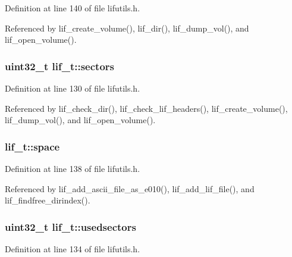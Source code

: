 Definition at line 140 of file lifutils.\+h.



Referenced by lif\+\_\+create\+\_\+volume(), lif\+\_\+dir(), lif\+\_\+dump\+\_\+vol(), and lif\+\_\+open\+\_\+volume().

\subsubsection[{\texorpdfstring{sectors}{sectors}}]{\setlength{\rightskip}{0pt plus 5cm}uint32\+\_\+t lif\+\_\+t\+::sectors}\hypertarget{structlif__t_a262b14d8547abff49d9dd1b445faf6d5}{}\label{structlif__t_a262b14d8547abff49d9dd1b445faf6d5}


Definition at line 130 of file lifutils.\+h.



Referenced by lif\+\_\+check\+\_\+dir(), lif\+\_\+check\+\_\+lif\+\_\+headers(), lif\+\_\+create\+\_\+volume(), lif\+\_\+dump\+\_\+vol(), and lif\+\_\+open\+\_\+volume().

\subsubsection[{\texorpdfstring{space}{space}}]{ lif\+\_\+t\+::space}\hypertarget{structlif__t_ab9646edba4028b4c78bd3ccb6c523143}{}\label{structlif__t_ab9646edba4028b4c78bd3ccb6c523143}


Definition at line 138 of file lifutils.\+h.



Referenced by lif\+\_\+add\+\_\+ascii\+\_\+file\+\_\+as\+\_\+e010(), lif\+\_\+add\+\_\+lif\+\_\+file(), and lif\+\_\+findfree\+\_\+dirindex().

\subsubsection[{\texorpdfstring{usedsectors}{usedsectors}}]{\setlength{\rightskip}{0pt plus 5cm}uint32\+\_\+t lif\+\_\+t\+::usedsectors}\hypertarget{structlif__t_ad81767a2f65b997d5abecba130b89814}{}\label{structlif__t_ad81767a2f65b997d5abecba130b89814}


Definition at line 134 of file lifutils.\+h.



